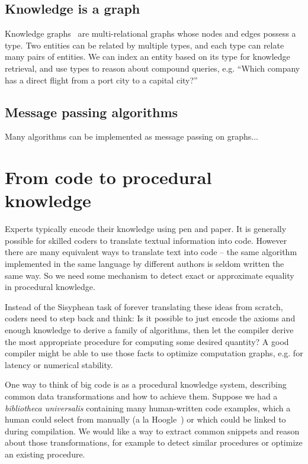 \documentclass[11pt]{article}
\begin{document}
    \subsection{Knowledge is a graph}\label{subsec:kgs}

    Knowledge graphs~\citep{hogan2020knowledge} are multi-relational graphs whose nodes and edges possess a type. Two entities can be related by multiple types, and each type can relate many pairs of entities. We can index an entity based on its type for knowledge retrieval, and use types to reason about compound queries, e.g. ``Which company has a direct flight from a port city to a capital city?''

    \subsection{Message passing algorithms}

    Many algorithms can be implemented as message passing on graphs...


    \pagebreak\section{From code to procedural knowledge}\label{sec:applications}

    Experts typically encode their knowledge using pen and paper. It is generally possible for skilled coders to translate textual information into code. However there are many equivalent ways to translate text into code -- the same algorithm implemented in the same language by different authors is seldom written the same way. So we need some mechanism to detect exact or approximate equality in procedural knowledge.

    Instead of the Sisyphean task of forever translating these ideas from scratch, coders need to step back and think: Is it possible to just encode the axioms and enough knowledge to derive a family of algorithms, then let the compiler derive the most appropriate procedure for computing some desired quantity? A good compiler might be able to use those facts to optimize computation graphs, e.g. for latency or numerical stability.

    One way to think of big code is as a procedural knowledge system, describing common data transformations and how to achieve them. Suppose we had a \textit{bibliotheca universalis} containing many human-written code examples, which a human could select from manually (a la Hoogle~\citep{james2020digging}) or which could be linked to during compilation. We would like a way to extract common snippets and reason about those transformations, for example to detect similar procedures or optimize an existing procedure.
\end{document}
